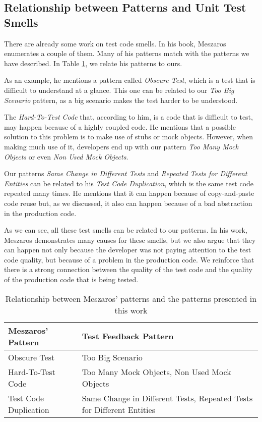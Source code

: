 \documentclass[times]{elsarticle}
\begin{document}
\subsection{Relationship between Patterns and Unit Test Smells}

There are already some work on test code smells. In his book, Meszaros \cite{meszaros}
enumerates a couple of them. Many of his patterns match with the patterns we have
described. In Table \ref{tab:eu-e-meszaros}, we relate his patterns to ours.

As an example, he mentions a pattern called \textit{Obscure Test}, which is
a test that is difficult to understand at a glance. This one can be related to our
\textit{Too Big Scenario} pattern, as a big scenario makes the test harder to be
understood.

The \textit{Hard-To-Test Code} that, according to him, is a code that is difficult
to test, may happen because of a highly coupled code. He mentions that a possible solution
to this problem is to make use of stubs or mock objects. However, when making much use of it,
developers end up with our pattern \textit{Too Many Mock Objects} or even \textit{Non Used Mock Objects}.

Our patterns \textit{Same Change in Different Tests} and \textit{Repeated Tests for Different
Entities} can be related to his \textit{Test Code Duplication}, which is the same test code
repeated many times. He mentions that it can happen because of copy-and-paste code reuse but,
as we discussed, it also can happen because of a bad abstraction in the production code.

As we can see, all these test smells can be related to our patterns. In his work, Meszaros demonstrates
many causes for these smells, but we also argue that they can happen not only because the developer
was not paying attention to the test code quality, but because of a problem in the production code.
We reinforce that there is a strong connection between the quality of the test code and the quality
of the production code that is being tested.

\begin{table}[h!]
	\centering
	\begin{tabular}{| p{6cm} | p{6cm}| }
		\hline

		\textbf{Meszaros' Pattern} & \textbf{Test Feedback Pattern}\\
		
		\hline

		Obscure Test & Too Big Scenario \\ \hline
		Hard-To-Test Code & Too Many Mock Objects, Non Used Mock Objects \\ \hline
		Test Code Duplication & Same Change in Different Tests, Repeated Tests for Different Entities \\
		\hline
		
	\end{tabular}
	\caption{Relationship between Meszaros' patterns and the patterns presented in this work}
	\label{tab:eu-e-meszaros}
\end{table}
\end{document}
